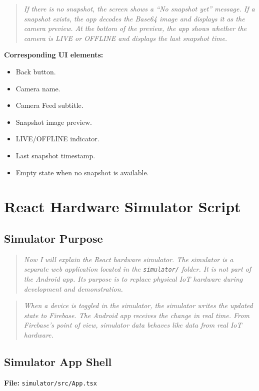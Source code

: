 \documentclass[11pt,a4paper]{article}
\begin{document}
\begin{quote}
\textit{If there is no snapshot, the screen shows a ``No snapshot yet'' message. If a snapshot exists, the app decodes the Base64 image and displays it as the camera preview. At the bottom of the preview, the app shows whether the camera is LIVE or OFFLINE and displays the last snapshot time.}
\end{quote}

\textbf{Corresponding UI elements:}
\begin{itemize}
    \item Back button.
    \item Camera name.
    \item Camera Feed subtitle.
    \item Snapshot image preview.
    \item LIVE/OFFLINE indicator.
    \item Last snapshot timestamp.
    \item Empty state when no snapshot is available.
\end{itemize}

\section{React Hardware Simulator Script}

\subsection{Simulator Purpose}
\begin{quote}
\textit{Now I will explain the React hardware simulator. The simulator is a separate web application located in the \texttt{simulator/} folder. It is not part of the Android app. Its purpose is to replace physical IoT hardware during development and demonstration.}
\end{quote}

\begin{quote}
\textit{When a device is toggled in the simulator, the simulator writes the updated state to Firebase. The Android app receives the change in real time. From Firebase's point of view, simulator data behaves like data from real IoT hardware.}
\end{quote}

\subsection{Simulator App Shell}
\textbf{File:} \texttt{simulator/src/App.tsx}
\end{document}
